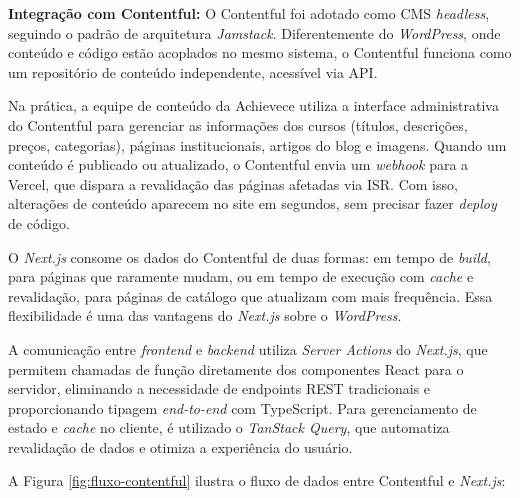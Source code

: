 \textbf{Integração com Contentful:} O Contentful foi adotado como CMS \textit{headless}, seguindo o padrão de arquitetura \textit{Jamstack}. Diferentemente do \textit{WordPress}, onde conteúdo e código estão acoplados no mesmo sistema, o Contentful funciona como um repositório de conteúdo independente, acessível via API.

Na prática, a equipe de conteúdo da Achievece utiliza a interface administrativa do Contentful para gerenciar as informações dos cursos (títulos, descrições, preços, categorias), páginas institucionais, artigos do blog e imagens. Quando um conteúdo é publicado ou atualizado, o Contentful envia um \textit{webhook} para a Vercel, que dispara a revalidação das páginas afetadas via ISR. Com isso, alterações de conteúdo aparecem no site em segundos, sem precisar fazer \textit{deploy} de código.

O \textit{Next.js} consome os dados do Contentful de duas formas: em tempo de \textit{build}, para páginas que raramente mudam, ou em tempo de execução com \textit{cache} e revalidação, para páginas de catálogo que atualizam com mais frequência. Essa flexibilidade é uma das vantagens do \textit{Next.js} sobre o \textit{WordPress}.

A comunicação entre \textit{frontend} e \textit{backend} utiliza \textit{Server Actions} do \textit{Next.js}, que permitem chamadas de função diretamente dos componentes React para o servidor, eliminando a necessidade de endpoints REST tradicionais e proporcionando tipagem \textit{end-to-end} com TypeScript. Para gerenciamento de estado e \textit{cache} no cliente, é utilizado o \textit{TanStack Query}, que automatiza revalidação de dados e otimiza a experiência do usuário.

A Figura \ref{fig:fluxo-contentful} ilustra o fluxo de dados entre Contentful e \textit{Next.js}:

